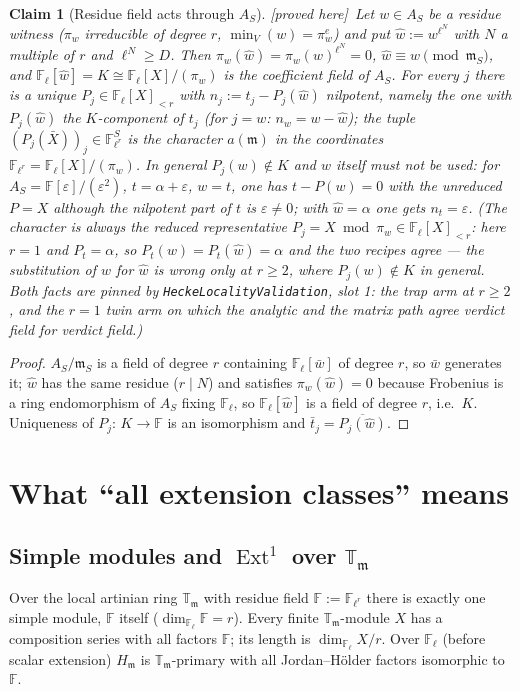 \documentclass[11pt]{article}
\newtheorem{claim}[theorem]{Claim}
\theoremstyle{remark}
\newcommand{\F}{\mathbb{F}}
\newcommand{\Fl}{\F_\ell}
\newcommand{\Flr}{\F_{\ell^r}}
\DeclareMathOperator{\Ext}{Ext}
\newcommand{\T}{\mathbb{T}}
\newcommand{\m}{\mathfrak{m}}
\newcommand{\PROVED}{\textsf{[proved here]}}
\begin{document}
\begin{claim}[Residue field acts through $A_S$]\label{cl:resfield}\PROVED\
Let $w\in A_S$ be a residue witness ($\pi_w$ irreducible of degree $r$, $\min_V(w)=\pi_w^{e}$)
and put $\hat w:=w^{\ell^{N}}$ with $N$ a multiple of $r$ and $\ell^N\ge D$. Then
$\pi_w(\hat w)=\pi_w(w)^{\ell^N}=0$, $\hat w\equiv w\pmod{\m_S}$, and $\Fl[\hat w]=K\cong\Fl[X]/(\pi_w)$
is the coefficient field of $A_S$. For every $j$ there is a unique $P_j\in\Fl[X]_{<r}$ with
$n_j:=t_j-P_j(\hat w)$ nilpotent, namely the one with $P_j(\hat w)$ the $K$-component of $t_j$
(for $j=w$: $n_w=w-\hat w$); the tuple $(P_j(\bar X))_j\in\Flr^{S}$ is the character $a(\m)$ in
the coordinates $\Flr=\Fl[X]/(\pi_w)$. In general $P_j(w)\notin K$ and $w$ itself must not be
used: for $A_S=\F[\varepsilon]/(\varepsilon^2)$, $t=\alpha+\varepsilon$, $w=t$, one has
$t-P(w)=0$ with the \emph{unreduced} $P=X$ although the nilpotent part of $t$ is
$\varepsilon\neq0$; with $\hat w=\alpha$ one gets $n_t=\varepsilon$. (The character is always
the reduced representative $P_j=X\bmod\pi_w\in\Fl[X]_{<r}$: here $r=1$ and $P_t=\alpha$, so
$P_t(w)=P_t(\hat w)=\alpha$ and the two recipes agree --- the substitution of $w$ for $\hat w$
is wrong only at $r\ge2$, where $P_j(w)\notin K$ in general. Both facts are pinned by
\texttt{HeckeLocalityValidation}, slot 1: the trap arm at $r\ge2$, and the $r=1$ twin arm on
which the analytic and the matrix path agree verdict field for verdict field.)
\end{claim}
\begin{proof}
$A_S/\m_S$ is a field of degree $r$ containing $\Fl[\bar w]$ of degree $r$, so $\bar w$ generates
it; $\hat w$ has the same residue ($r\mid N$) and satisfies $\pi_w(\hat w)=0$ because Frobenius
is a ring endomorphism of $A_S$ fixing $\Fl$, so $\Fl[\hat w]$ is a field of degree $r$, i.e.\
$K$. Uniqueness of $P_j$: $K\to\F$ is an isomorphism and $\bar t_j=\overline{P_j(\hat w)}$.
\end{proof}

\section{What ``all extension classes'' means}\label{sec:ext}

\subsection{Simple modules and \texorpdfstring{$\Ext^1$ over $\T_\m$}{Ext1 over T\_m}}
Over the local artinian ring $\T_\m$ with residue field $\F:=\Flr$ there is exactly one simple
module, $\F$ itself ($\dim_{\Fl}\F=r$). Every finite $\T_\m$-module $X$ has a composition
series with all factors $\F$; its length is $\dim_{\Fl}X/r$. Over $\Fl$ (before scalar
extension) $H_\m$ is $\T_\m$-primary with all Jordan--H\"older factors isomorphic to $\F$.
\end{document}

